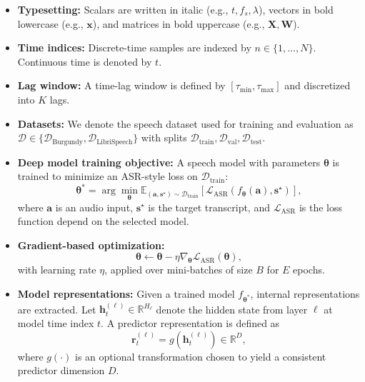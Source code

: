 \documentclass[12pt]{article}
\begin{document}
\begin{itemize}
  \item \textbf{Typesetting:} Scalars are written in italic (e.g., $t, f_s, \lambda$), vectors in bold
  lowercase (e.g., $\boldsymbol{x}$), and matrices in bold uppercase (e.g., $\mathbf{X}, \mathbf{W}$).
  \item \textbf{Time indices:} Discrete-time samples are indexed by $n \in \{1,\dots,N\}$. Continuous time is denoted by $t$.
  \item \textbf{Lag window:} A time-lag window is defined by $[\tau_{\min}, \tau_{\max}]$ and discretized into $K$ lags.

  \item \textbf{Datasets:} We denote the speech dataset used for training and evaluation as
  $\mathcal{D} \in \{\mathcal{D}_{\text{Burgundy}},\mathcal{D}_{\text{LibriSpeech}}\}$ with splits
  $\mathcal{D}_{\text{train}}, \mathcal{D}_{\text{val}}, \mathcal{D}_{\text{test}}$.

  \item \textbf{Deep model training objective:} A speech model with parameters $\boldsymbol{\theta}$ is trained to minimize
  an ASR-style loss on $\mathcal{D}_{\text{train}}$:
  \[
    \boldsymbol{\theta}^\ast
    = \arg\min_{\boldsymbol{\theta}}
      \mathbb{E}_{(\boldsymbol{a}, \boldsymbol{s}^\star)\sim \mathcal{D}_{\text{train}}}
      \left[\mathcal{L}_{\mathrm{ASR}}\!\left(f_{\boldsymbol{\theta}}(\boldsymbol{a}), \boldsymbol{s}^\star\right)\right],
  \]
  where $\boldsymbol{a}$ is an audio input, $\boldsymbol{s}^\star$ is the target transcript,
  and $\mathcal{L}_{\mathrm{ASR}}$ is the loss function depend on the selected model.

  \item \textbf{Gradient-based optimization:}
  \[
    \boldsymbol{\theta} \leftarrow \boldsymbol{\theta} - \eta \nabla_{\boldsymbol{\theta}} \mathcal{L}_{\mathrm{ASR}}(\boldsymbol{\theta}),
  \]
  with learning rate $\eta$, applied over mini-batches of size $B$ for $E$ epochs.

  \item \textbf{Model representations:} Given a trained model $f_{\boldsymbol{\theta}^\ast}$, internal representations are extracted.
  Let $\boldsymbol{h}^{(\ell)}_t \in \mathbb{R}^{H_\ell}$ denote the hidden state from layer $\ell$ at model time index $t$.
  A predictor representation is defined as
  \[
    \boldsymbol{r}^{(\ell)}_t = g\!\left(\boldsymbol{h}^{(\ell)}_t\right) \in \mathbb{R}^{D},
  \]
  where $g(\cdot)$ is an optional transformation chosen to yield a consistent predictor dimension $D$.


\end{itemize}
\end{document}
